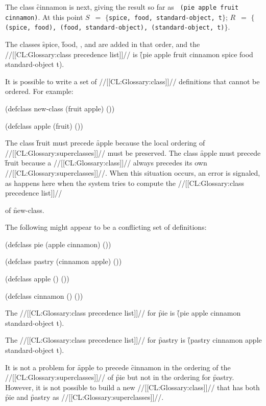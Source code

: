 The class \f{cinnamon} is next, giving the result so far as {\tt
(pie apple fruit cinnamon)}.  At this point $S$~$=$ $\{${\tt spice,
food, standard-object, t}$\}$; $R$~$=$ $\{${\tt (spice, food), (food,
standard-object), (standard-object, t)}$\}$.

The classes \f{spice}, \f{food}, , and 
 are added in that order, and the //[[CL:Glossary:class precedence list]]// 
is \f{(pie apple fruit cinnamon spice food standard-object t)}.

It is possible to write a set of //[[CL:Glossary:class]]// definitions that cannot be 
ordered.   For example: 

\code
 (defclass new-class (fruit apple) ())
 
 (defclass apple (fruit) ())
\endcode

The class \f{fruit} must precede \f{apple} 
because the local ordering of //[[CL:Glossary:superclasses]]// must be preserved.
The class \f{apple} must precede \f{fruit} 
because a //[[CL:Glossary:class]]// always precedes its own //[[CL:Glossary:superclasses]]//.
When this situation occurs, an error is signaled, as happens here
when the system tries to compute the //[[CL:Glossary:class precedence list]]// 

of \f{new-class}.

The following might appear to be a conflicting set of definitions:

\code
 (defclass pie (apple cinnamon) ())
 
 (defclass pastry (cinnamon apple) ())
 
 (defclass apple () ())
 
 (defclass cinnamon () ())
\endcode

The //[[CL:Glossary:class precedence list]]// for \f{pie} is 
\f{(pie apple cinnamon standard-object t)}.

The //[[CL:Glossary:class precedence list]]// for \f{pastry} is  
\f{(pastry cinnamon apple standard-object t)}.

It is not a problem for \f{apple} to precede \f{cinnamon} in the
ordering of the //[[CL:Glossary:superclasses]]// of \f{pie} but not in the ordering for
\f{pastry}.  However, it is not possible to build a new //[[CL:Glossary:class]]// that
has both \f{pie} and \f{pastry} as //[[CL:Glossary:superclasses]]//.

\endsubsubsection%

\endsubSection%
                                

